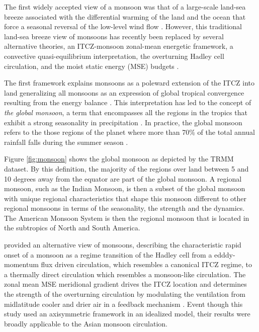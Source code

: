 The first widely accepted view of a monsoon was that of a large-scale land-sea breeze associated with the differential warming of the land and the ocean that force a seasonal reversal of the low-level wind flow \citep{halley}. However, this traditional land-sea breeze view of monsoons has recently been replaced by several alternative theories, an ITCZ-monsoon zonal-mean energetic framework, a convective quasi-equilibrium interpretation, the overturning Hadley cell circulation, and the moist static energy (MSE) budgets \citep{biasutti2018global,hill2019,geen2020}. 

The first framework  explains monsoons as a poleward extension of the ITCZ into land  generalizing all monsoons as an expression of global tropical convergence resulting from the energy balance \citep{chao2001origin,gadgil2018}. This interpretation has led to the concept of \textit{the global monsoon}, a term that encompasses all the regions in the tropics that exhibit a strong seasonality in precipitation \citep{zhou2016,gadgil2018}. 
In practice, the global monsoon refers to the those regions of the planet where more than 70\% of the total annual rainfall falls during the summer season \citep{zhou2016,wang2017}.

Figure \ref{fig:monsoon} shows the global monsoon as depicted by the TRMM dataset. By this definition, the majority of the regions over land between 5 and 10 degrees away from the equator are part of the global monsoon.
A regional monsoon, such as the Indian Monsoon, is then a subset of the global monsoon with unique regional characteristics that shape this monsoon different to other regional monsoons in terms of the seasonality, the strength and the dynamics. 
The American Monsoon System is then the regional monsoon that is located in the subtropics of North and South America. 



\cite{bordoni2008monsoons} provided an alternative view of monsoons, describing the characteristic rapid onset of a monsoon as a regime transition of the Hadley cell from a edddy-momentum flux driven circulation, which resembles a canonical ITCZ regime, to a thermally direct circulation which resembles a monsoon-like circulation. The zonal mean MSE meridional gradient drives the ITCZ location and determines the strength of the overturning circulation by modulating the ventilation from midlatitude cooler and drier air in a feedback mechanism \citep{geen2020}. Event though this study used an axisymmetric framework in an idealized model, their results were broadly applicable to the Asian monsoon circulation. 




